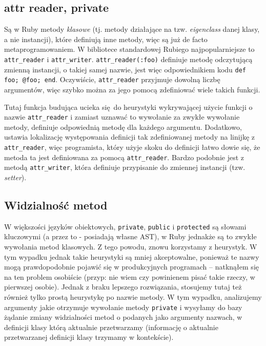 \documentclass[declaration,shortabstract]{iithesis}
\begin{document}
\subsection{attr reader, private}

Są w Ruby metody \textit{klasowe} (tj. metody działające na tzw. \textit{eigenclass} danej klasy, a nie instancji), które definiują inne metody, więc są już de facto metaprogramowaniem.
W bibliotece standardowej Rubiego najpopularniejsze to \texttt{attr\_reader} i \texttt{attr\_writer}.
\texttt{attr\_reader(:foo)} definiuje metodę odczytującą zmienną instancji, o takiej samej nazwie, jest więc odpowiednikiem kodu \texttt{def foo; @foo; end}. Oczywiście, \texttt{attr\_reader} przyjmuje dowolną liczbę argumentów, więc szybko można za jego pomocą zdefiniować wiele takich funkcji.

Tutaj funkcja budująca ucieka się do heurystyki wykrywającej użycie funkcji o nazwie \texttt{attr\_reader} i zamiast uznawać to wywołanie za zwykłe wywołanie metody, definiuje odpowiednią metodę dla każdego argumentu. Dodatkowo, ustawia lokalizację występowania definicji tak zdefiniowanej metody na linijkę z \texttt{attr\_reader}, więc programista, który użyje skoku do definicji łatwo dowie się, że metoda ta jest definiowana za pomocą \texttt{attr\_reader}. Bardzo podobnie jest z metodą \texttt{attr\_writer}, która definiuje przypisanie do zmiennej instancji (tzw. \textit{setter}).

\subsection{Widzialność metod}

W większości języków obiektowych, \texttt{private}, \texttt{public} i \texttt{protected} są słowami kluczowymi (a przez to - posiadają własne AST), w Ruby jednakże są to zwykłe wywołania metod klasowych. Z tego powodu, znowu korzystamy z heurystyk. W tym wypadku jednak takie heurystyki są mniej akceptowalne, ponieważ te nazwy mogą prawdopodobnie pojawić się w produkcyjnych programach -- natknąłem się na ten problem osobiście (przyp: nie wiem czy powinienem pisać takie rzeczy, w pierwszej osobie). Jednak z braku lepszego rozwiązania, stosujemy tutaj też również tylko prostą heurystykę po nazwie metody. W tym wypadku, analizujemy argumenty jakie otrzymuje wywołanie metody \texttt{private} i wysyłamy do bazy żądanie zmiany widzialności metod o podanych jako argumenty nazwach, w definicji klasy którą aktualnie przetwarzamy (informację o aktualnie przetwarzanej definicji klasy trzymamy w kontekście).
\end{document}
